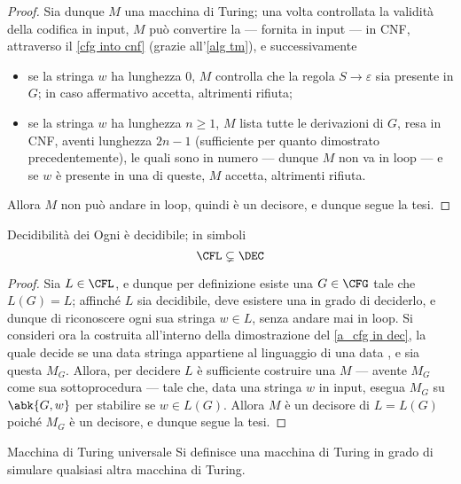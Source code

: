 \documentclass[a4paper, 12pt]{report}
\begin{document}
\begin{proof}
        Sia dunque $M$ una macchina di Turing; una volta controllata la validità della codifica in input, $M$ può convertire la \CFG --- fornita in input --- in CNF, attraverso il \cref{cfg into cnf} (grazie all'\cref{alg tm}), e successivamente

        \begin{itemize}
            \item se la stringa $w$ ha lunghezza 0, $M$ controlla che la regola $S \to \varepsilon$ sia presente in $G$; in caso affermativo accetta, altrimenti rifiuta;
            \item se la stringa $w$ ha lunghezza $n \ge 1$, $M$ lista tutte le derivazioni di $G$, resa in CNF, aventi lunghezza $2n - 1$ (sufficiente per quanto dimostrato precedentemente), le quali sono in numero  --- dunque $M$ non va in loop --- e se $w$ è presente in una di queste, $M$ accetta, altrimenti rifiuta.
        \end{itemize}

        Allora $M$ non può andare in loop, quindi è un decisore, e dunque segue la tesi.
    \end{proof}

    \begin{framedcor}[label={cfl subset dec}]{Decidibilità dei \CFL}
        Ogni \CFL è decidibile; in simboli $$\CFL \subsetneq \DEC$$
    \end{framedcor}

    \begin{proof}
        Sia $L \in \CFL$, e dunque per definizione esiste una $G \in \CFG$ tale che $L(G) = L$; affinché $L$ sia decidibile, deve esistere una \TM in grado di deciderlo, e dunque di riconoscere ogni sua stringa $w \in L$, senza andare mai in loop. Si consideri ora la \TM costruita all'interno della dimostrazione del \cref{a_cfg in dec}, la quale decide se una data stringa appartiene al linguaggio di una data \CFG, e sia questa $M_G$. Allora, per decidere $L$ è sufficiente costruire una \TM $M$ --- avente $M_G$ come sua sottoprocedura --- tale che, data una stringa $w$ in input, esegua $M_G$ su $\abk{G, w}$ per stabilire se $w \in L(G)$. Allora $M$ è un decisore di $L = L(G)$ poiché $M_G$ è un decisore, e dunque segue la tesi.
    \end{proof}

    \begin{frameddefn}{Macchina di Turing universale}
        Si definisce  una macchina di Turing in grado di simulare qualsiasi altra macchina di Turing.
    \end{frameddefn}
\end{document}
